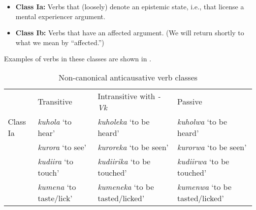 \documentclass[output=paper]{langsci/lanmgscibook}
\begin{document}
\begin{itemize}[noitemsep]
 \item \textbf{Class Ia:} Verbs that (loosely) denote an epistemic state, i.e., that license a mental experiencer argument.
 \item \textbf{Class Ib:} Verbs that have an affected argument. (We will return shortly to what we mean by “affected.”)

\end{itemize}



Examples of verbs in these classes are shown in .

\begin{table}
\caption{Non-canonical anticausative verb classes}
\label{tab:gluckman:4}

\begin{tabularx}{\textwidth}{lp{2.5cm}XX} & {Transitive} & {Intransitive with} {\textit{-Vk}} & {Passive}\\
\lsptoprule
{Class Ia} & \textit{kuhola} \newline ‘to hear’ & \textit{kuholeka} \newline ‘to be heard’ & \textit{kuholwa} \newline ‘to be heard’\\
\tablevspace 
& \textit{kurora} \newline ‘to see’ & \textit{kuroreka} \newline ‘to be seen’ & \textit{kurorwa} \newline ‘to be seen’\\
\tablevspace 
& \textit{kudiira} \newline ‘to touch’ & \textit{kudiirika} \newline ‘to be touched’ & \textit{kudiirwa} \newline ‘to be touched’\\
\tablevspace 
& \textit{kumena} \newline ‘to taste/lick’ & \textit{kumeneka} \newline ‘to be tasted/licked’ & \textit{kumenwa} \newline ‘to be tasted/licked’\\


\end{tabularx}
\end{table}
\end{document}
